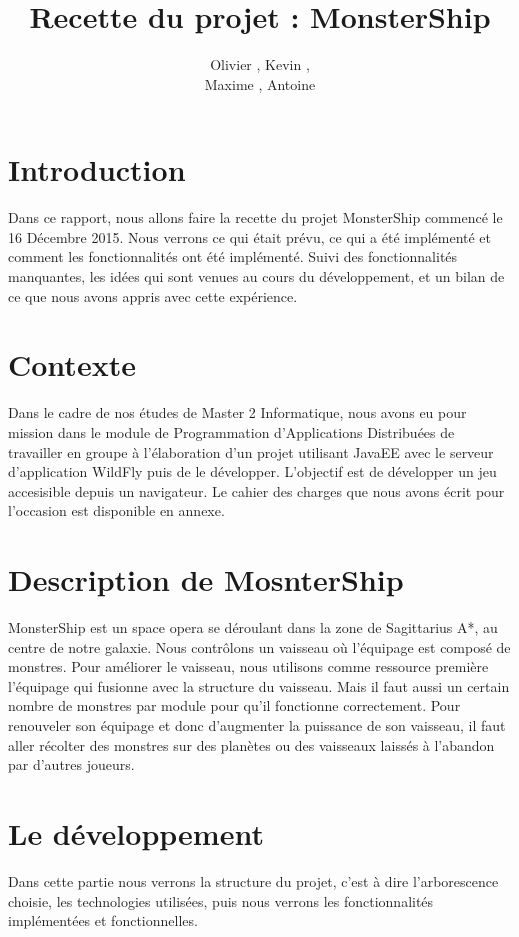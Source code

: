 \documentclass[a4paper,11pt]{report}
\title{Recette du projet : MonsterShip}
\author{Olivier \bsc{Boissard}, Kevin \bsc{Boulala},\\Maxime \bsc{Dubois}, Antoine \bsc{Lavier}}
\begin{document}
\maketitle
\setcounter{tocdepth}{1}
\tableofcontents

\chapter{Introduction}
  Dans ce rapport, nous allons faire la recette du projet MonsterShip commencé le 16 Décembre 2015. Nous verrons ce qui était prévu, ce qui a été implémenté et comment les fonctionnalités ont été implémenté. Suivi des fonctionnalités manquantes, les idées qui sont venues au cours du développement, et un bilan de ce que nous avons appris avec cette expérience.
  
\chapter{Contexte}
  Dans le cadre de nos études de Master 2 Informatique, nous avons eu pour mission dans le module de Programmation d'Applications Distribuées de travailler en groupe à l'élaboration d'un projet utilisant JavaEE avec le serveur d'application WildFly puis de le développer. L'objectif est de développer un jeu accesisible depuis un navigateur. Le cahier des charges que nous avons écrit pour l'occasion est disponible en annexe.

\chapter{Description de MosnterShip}
  MonsterShip est un space opera se déroulant dans la zone de Sagittarius A*, au centre de notre galaxie. Nous contrôlons un vaisseau où l'équipage est composé de monstres. Pour améliorer le vaisseau, nous utilisons comme ressource première l'équipage qui fusionne avec la structure du vaisseau. Mais il faut aussi un certain nombre de monstres par module pour qu'il fonctionne correctement. Pour renouveler son équipage et donc d'augmenter la puissance de son vaisseau, il faut aller récolter des monstres sur des planètes ou des vaisseaux laissés à l'abandon par d'autres joueurs.

\chapter{Le développement}
  Dans cette partie nous verrons la structure du projet, c'est à dire l'arborescence choisie, les technologies utilisées, puis nous verrons les fonctionnalités implémentées et fonctionnelles.
\end{document}
